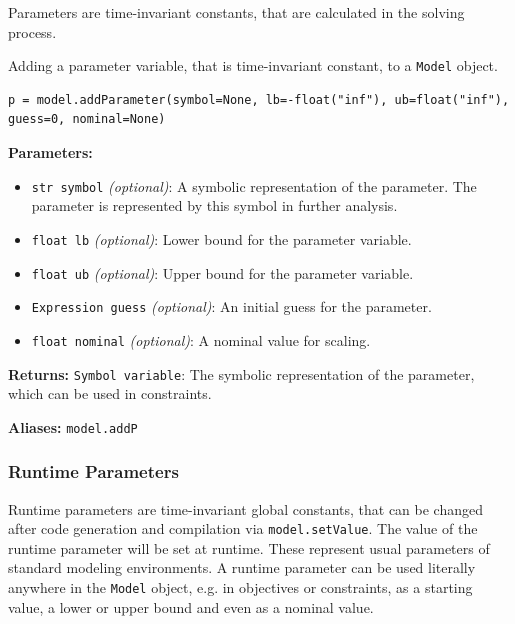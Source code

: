 \documentclass[12pt]{article}
\begin{document}
Parameters are time-invariant constants, that are calculated in the
solving process.

\begin{mdframed}[backgroundcolor=gray!10, roundcorner=10pt,
		linewidth=1pt]

	Adding a parameter variable, that is time-invariant constant,
	to a \texttt{Model} object.

	\begin{lstlisting}
p = model.addParameter(symbol=None, lb=-float("inf"), ub=float("inf"), guess=0, nominal=None)
		\end{lstlisting}
	\label{addParameter}
	\textbf{Parameters:}
	\begin{itemize}
		\item \texttt{str symbol} \emph{(optional)}: A symbolic
		      representation of the parameter. The parameter is
		      represented by this
		      symbol in further analysis.
		\item \texttt{float lb} \emph{(optional)}: Lower bound
		      for the parameter variable.
		\item \texttt{float ub} \emph{(optional)}: Upper bound
		      for the parameter variable.
		\item \texttt{Expression guess} \emph{(optional)}: An
		      initial guess for the parameter.
		\item \texttt{float nominal} \emph{(optional)}: A
		      nominal value for scaling.
	\end{itemize}

	\textbf{Returns:}
	\texttt{Symbol variable}: The symbolic representation of the
	parameter, which can be used in constraints.

	\textbf{Aliases:} \texttt{model.addP}
\end{mdframed}

\subsubsection{Runtime Parameters}
\label{c:runtimeParameters}
Runtime parameters are time-invariant global constants, that can be
changed after code generation and compilation via \texttt{model.setValue}. The value of the
runtime parameter will be set at runtime. These represent usual
parameters of standard modeling environments. A runtime parameter can be used
literally anywhere in the \texttt{Model} object, e.g. in objectives or
constraints, as a starting value, a lower or upper bound and even as a nominal
value.
\end{document}

